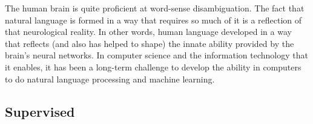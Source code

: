 The human brain is quite proficient at word-sense disambiguation. The fact that natural language is formed in a way that requires so much of it is a reflection of that neurological reality. In other words, human language developed in a way that reflects (and also has helped to shape) the innate ability provided by the brain's neural networks. In computer science and the information technology that it enables, it has been a long-term challenge to develop the ability in computers to do natural language processing and machine learning. 

\subsection*{Supervised}

